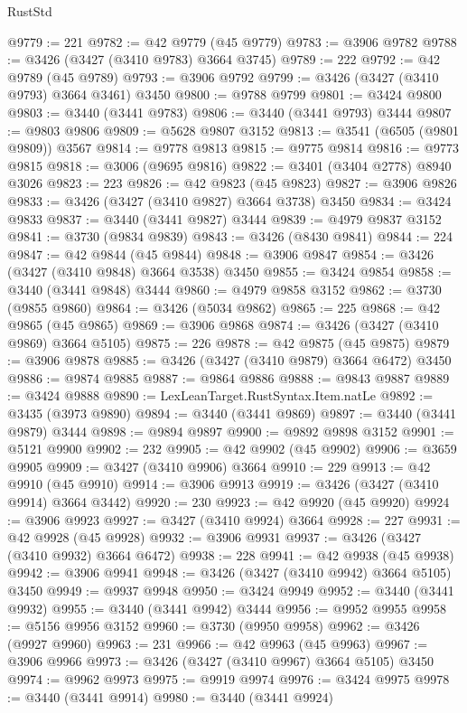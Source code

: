\begin{lexlean}{RustStd}
\begin{coremodule}
@9779 := 221
@9782 := @42 @9779 (@45 @9779)
@9783 := @3906 @9782
@9788 := @3426 (@3427 (@3410 @9783) @3664 @3745)
@9789 := 222
@9792 := @42 @9789 (@45 @9789)
@9793 := @3906 @9792
@9799 := @3426 (@3427 (@3410 @9793) @3664 @3461) @3450
@9800 := @9788 @9799
@9801 := @3424 @9800
@9803 := @3440 (@3441 @9783)
@9806 := @3440 (@3441 @9793) @3444
@9807 := @9803 @9806
@9809 := @5628 @9807 @3152
@9813 := @3541 (@6505 (@9801 @9809)) @3567
@9814 := @9778 @9813
@9815 := @9775 @9814
@9816 := @9773 @9815
@9818 := @3006 (@9695 @9816)
@9822 := @3401 (@3404 @2778) @8940 @3026
@9823 := 223
@9826 := @42 @9823 (@45 @9823)
@9827 := @3906 @9826
@9833 := @3426 (@3427 (@3410 @9827) @3664 @3738) @3450
@9834 := @3424 @9833
@9837 := @3440 (@3441 @9827) @3444
@9839 := @4979 @9837 @3152
@9841 := @3730 (@9834 @9839)
@9843 := @3426 (@8430 @9841)
@9844 := 224
@9847 := @42 @9844 (@45 @9844)
@9848 := @3906 @9847
@9854 := @3426 (@3427 (@3410 @9848) @3664 @3538) @3450
@9855 := @3424 @9854
@9858 := @3440 (@3441 @9848) @3444
@9860 := @4979 @9858 @3152
@9862 := @3730 (@9855 @9860)
@9864 := @3426 (@5034 @9862)
@9865 := 225
@9868 := @42 @9865 (@45 @9865)
@9869 := @3906 @9868
@9874 := @3426 (@3427 (@3410 @9869) @3664 @5105)
@9875 := 226
@9878 := @42 @9875 (@45 @9875)
@9879 := @3906 @9878
@9885 := @3426 (@3427 (@3410 @9879) @3664 @6472) @3450
@9886 := @9874 @9885
@9887 := @9864 @9886
@9888 := @9843 @9887
@9889 := @3424 @9888
@9890 := LexLeanTarget.RustSyntax.Item.natLe
@9892 := @3435 (@3973 @9890)
@9894 := @3440 (@3441 @9869)
@9897 := @3440 (@3441 @9879) @3444
@9898 := @9894 @9897
@9900 := @9892 @9898 @3152
@9901 := @5121 @9900
@9902 := 232
@9905 := @42 @9902 (@45 @9902)
@9906 := @3659 @9905
@9909 := @3427 (@3410 @9906) @3664
@9910 := 229
@9913 := @42 @9910 (@45 @9910)
@9914 := @3906 @9913
@9919 := @3426 (@3427 (@3410 @9914) @3664 @3442)
@9920 := 230
@9923 := @42 @9920 (@45 @9920)
@9924 := @3906 @9923
@9927 := @3427 (@3410 @9924) @3664
@9928 := 227
@9931 := @42 @9928 (@45 @9928)
@9932 := @3906 @9931
@9937 := @3426 (@3427 (@3410 @9932) @3664 @6472)
@9938 := 228
@9941 := @42 @9938 (@45 @9938)
@9942 := @3906 @9941
@9948 := @3426 (@3427 (@3410 @9942) @3664 @5105) @3450
@9949 := @9937 @9948
@9950 := @3424 @9949
@9952 := @3440 (@3441 @9932)
@9955 := @3440 (@3441 @9942) @3444
@9956 := @9952 @9955
@9958 := @5156 @9956 @3152
@9960 := @3730 (@9950 @9958)
@9962 := @3426 (@9927 @9960)
@9963 := 231
@9966 := @42 @9963 (@45 @9963)
@9967 := @3906 @9966
@9973 := @3426 (@3427 (@3410 @9967) @3664 @5105) @3450
@9974 := @9962 @9973
@9975 := @9919 @9974
@9976 := @3424 @9975
@9978 := @3440 (@3441 @9914)
@9980 := @3440 (@3441 @9924)

\end{coremodule}
\end{lexlean}

